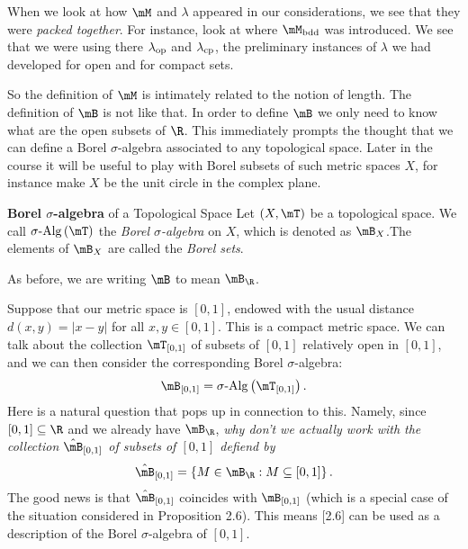\documentclass[pmath450]{subfiles}
\begin{document}
    \np When we look at how $\mM$ and $\lambda$ appeared in our considerations, we see that they were \textit{packed together}. For instance, look at where $\mM_{\bdd}$ was introduced. We see that we were using there $\lambda_{\operatorname{op}}$ and $\lambda_{\operatorname{cp}}$, the preliminary instances of $\lambda$ we had developed for open and for compact sets.

    So the definition of $\mM$ is intimately related to the notion of length. The definition of $\mB$ is not like that. In order to define $\mB$ we only need to know what are the open subsets of $\R$. This immediately prompts the thought that we can define a Borel $\sigma$-algebra associated to any topological space. Later in the course it will be useful to play with Borel subsets of such metric spaces $X$, for instance make $X$ be the unit circle in the complex plane.

    \begin{definition}{\textbf{Borel $\sigma$-algebra} of a Topological Space}
        Let $\left( X,\mT \right)$ be a topological space. We call $\sigalg\left( \mT \right)$ the \emph{Borel $\sigma$-algebra} on $X$, which is denoted as $\mB_X$.\footnotemark[1] The elements of $\mB_X$ are called the \emph{Borel sets}.

        \noindent
        \begin{minipage}{\textwidth}
        \end{minipage}
    \end{definition}

    \np As before, we are writing $\mB$ to mean $\mB_{\R}$.

    \np Suppose that our metric space is $\left[ 0,1 \right]$, endowed with the usual distance $d\left( x,y \right)=\left| x-y \right|$ for all $x,y\in\left[ 0,1 \right]$. This is a compact metric space. We can talk about the collection $\mT_{\left[ 0,1 \right]}$ of subsets of $\left[ 0,1 \right]$ relatively open in $\left[ 0,1 \right]$, and we can then consider the corresponding Borel $\sigma$-algebra:
    \begin{equation*}
        \mB_{\left[ 0,1 \right]} = \sigalg\left( \mT_{\left[ 0,1 \right]} \right).
    \end{equation*}
    Here is a natural question that pops up in connection to this. Namely, since $\left[ 0,1 \right]\subseteq\R$ and we already have $\mB_{\R}$, \textit{why don't we actually work with the collection $\hat{\mB}_{\left[ 0,1 \right]}$ of subsets of $\left[ 0,1 \right]$ defiend by}
    \begin{equation}
        \hat{\mB}_{\left[ 0,1 \right]} = \left\lbrace M\in\mB_{\R}: M\subseteq\left[ 0,1 \right] \right\rbrace.
    \end{equation}
    The good news is that $\hat{\mB}_{\left[ 0,1 \right]}$ coincides with $\mB_{\left[ 0,1 \right]}$ (which is a special case of the situation considered in Proposition 2.6). This means [2.6] can be used as a description of the Borel $\sigma$-algebra of $\left[ 0,1 \right]$.
\end{document}
